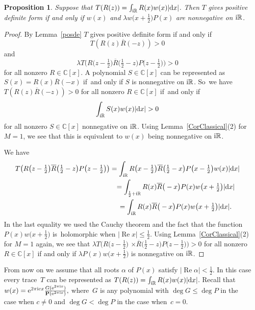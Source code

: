 \documentclass[pdftex]{sigma}
\newcommand{\RN}{\mathbb{R}} %
\newcommand{\CN}{\mathbb{C}} %
\newcommand{\ovl}{\overline}
\renewcommand{\Re}{\operatorname{Re}}
\newcommand{\bP}{\mathbf{P}}
\newtheorem{Proposition}[Theorem]{Proposition}
\theoremstyle{definition}
\numberwithin{equation}{section}
\begin{document}
\begin{Proposition}
\label{PropFromPositiveTraceToFunctions}
Suppose that $T(R(z))=\int_{{\rm i}\RN}R(x)w(x)|{\rm d}x|$. Then $T$ gives positive definite form if and only if $w(x)$ and $\lambda w\big(x+\frac{1}{2}\big)P(x)$ are nonnegative on ${\rm i}\RN$.
\end{Proposition}
\begin{proof} By Lemma~\ref{posde}
$T$ gives positive definite form if and only if
\[
T(R(z)\ovl{R}(-z))>0
\]
and
\[
\lambda T\big(R\big(z-\tfrac{1}{2}\big)\ovl{R}\big(\tfrac{1}{2}-z\big)P\big(z-\tfrac{1}{2}\big)\big)>0
\]
for all nonzero $R\in \CN[x]$. A polynomial $S\in \CN[x]$ can be represented as $S(x)=R(x)\ovl{R}(-x)$ if~and only if $S$ is nonnegative on ${\rm i}\RN$. So~we have $T(R(z)\ovl{R}(-z))>0$ for all nonzero $R\in \CN[x]$ if~and only if
\[
\int_{{\rm i}\RN}S(x)w(x)|{\rm d}x|>0
\]
for all nonzero $S\in \CN[x]$ nonnegative on ${\rm i}\RN$. Using Lemma~\ref{CorClassical}(2) for $M=1$, we see that this is equivalent to $w(x)$ being nonnegative on ${\rm i}\RN$.

We have
\begin{gather*}
T\big(R\big(z-\tfrac{1}{2}\big)\ovl{R}\big(\tfrac{1}{2}-z\big)P\big(z-\tfrac{1}{2}\big)\big)=\int_{{\rm i}\RN}R\big(x-\tfrac{1}{2}\big)\ovl{R}\big(\tfrac{1}{2}-x\big)P\big(x-\tfrac{1}{2}\big)w(x)|{\rm d}x|
\\ \hphantom{T\big(R\big(z-\tfrac{1}{2}\big)\ovl{R}\big(\tfrac{1}{2}-z\big)P\big(z-\tfrac{1}{2}\big)\big)}
{}=\int_{\frac{1}{2}+{\rm i}\RN}R(x)\ovl{R}\big(-x\big)P(x)w\big(x+\tfrac{1}{2}\big)|{\rm d}x|
\\ \hphantom{T\big(R\big(z-\tfrac{1}{2}\big)\ovl{R}\big(\tfrac{1}{2}-z\big)P\big(z-\tfrac{1}{2}\big)\big)}
{}=\int_{{\rm i}\RN}R(x)\ovl{R}\big(-x\big)P(x)w\big(x+\tfrac{1}{2}\big)|{\rm d}x|.
\end{gather*}
In the last equality we used the Cauchy theorem and the fact that the function \mbox{$P(x)w\big(x+\tfrac{1}{2}\big)$} is~holomorphic when $|\Re x|\leq \frac{1}{2}$. Using Lemma~\ref{CorClassical}(2) for $M=1$ again, we see that \mbox{$\lambda T\big(R\big(z-\frac{1}{2}\big)$} $\times\ovl{R}\big(\frac{1}{2}-z\big) P\big(z-\frac{1}{2}\big)\big)>0$ for all nonzero $R\in \CN[x]$ if and only if $\lambda P(x)w\big(x+\frac{1}{2}\big)$ is nonnegative on ${\rm i}\RN$.
\end{proof}

From now on we assume that all roots $\alpha$ of $P(x)$ satisfy $|\Re\alpha|<\frac{1}{2}$. In this case every trace~$T$ can be represented as $T(R(z))=\int_{{\rm i}\RN}R(x)w(x)|{\rm d}x|$.
Recall that $w(x)={\rm e}^{2\pi {\rm i}cx}\frac{G({\rm e}^{2\pi {\rm i} x})}{\bP({\rm e}^{2\pi {\rm i} x})},$ where~$G$ is any polynomial with $\deg G\leq \deg P$ in the case when $c\neq 0$ and $\deg G<\deg P$ in the case when~$c=0$.
\end{document}
